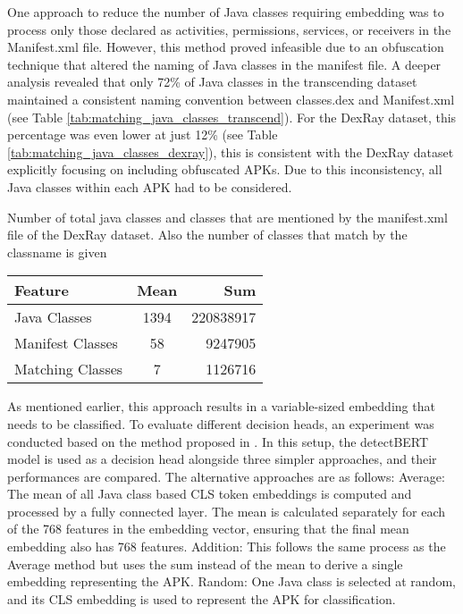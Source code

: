 One approach to reduce the number of Java classes requiring embedding was to process only those declared as activities, 
permissions, services, or receivers in the Manifest.xml file.
However, this method proved infeasible due to an obfuscation technique 
that altered the naming of Java classes in the manifest file.
A deeper analysis revealed that only 72\% of Java classes in the transcending dataset maintained 
a consistent naming convention between classes.dex and Manifest.xml (see Table \ref{tab:matching_java_classes_transcend}).
For the DexRay dataset, this percentage was even lower at just 12\% (see Table \ref{tab:matching_java_classes_dexray}),
this is consistent with the DexRay dataset explicitly focusing on including obfuscated APKs.
Due to this inconsistency, all Java classes within each APK had to be considered.

\begin{margintable}[-5\baselineskip]
    \caption{\label{tab:matching_java_classes_dexray} Number of total java classes and classes that are mentioned by the manifest.xml file of the DexRay dataset. Also the number of classes that match by the classname is given}
    \footnotesize
    \begin{tabular*}{\linewidth}{@{\extracolsep{\fill}} lcr@{}}
        \toprule
        \textbf{Feature} & \textbf{Mean} & \textbf{Sum} \\
        \midrule
        Java Classes & 1394 & 220838917 \\
        Manifest Classes & 58 & 9247905 \\
        Matching Classes & 7 & 1126716 \\
        \bottomrule
    \end{tabular*}
\end{margintable}

As mentioned earlier, this approach results in a variable-sized embedding that needs to be classified.
To evaluate different decision heads, an experiment was conducted based on the method proposed in \cite{detectbert}.
In this setup, the detectBERT model is used as a decision head alongside three simpler approaches, 
and their performances are compared.
The alternative approaches are as follows:
Average: The mean of all Java class based CLS token embeddings is computed and processed by a fully connected layer.
The mean is calculated separately for each of the 768 features in the embedding vector, 
ensuring that the final mean embedding also has 768 features.
Addition: This follows the same process as the Average method but uses the sum instead 
of the mean to derive a single embedding representing the APK.
Random: One Java class is selected at random, and its CLS embedding is used to represent the APK for classification.

